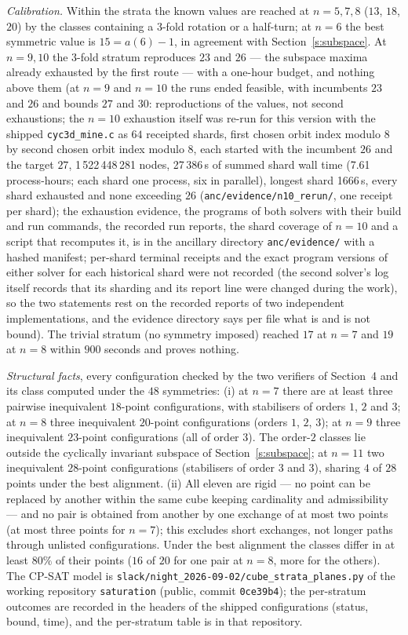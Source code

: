 \documentclass[11pt,a4paper]{article}
\begin{document}
\emph{Calibration.}  Within the strata the known values are reached at $n=5,7,8$ ($13$, $18$,
$20$) by the classes containing a $3$-fold rotation or a half-turn; at $n=6$ the best symmetric
value is $15=a(6)-1$, in agreement with Section~\ref{s:subspace}.  At $n=9,10$ the $3$-fold
stratum reproduces $23$ and $26$ --- the subspace maxima already exhausted by the first route ---
with a one-hour budget, and nothing above them (at $n=9$ and $n=10$ the runs ended feasible, with incumbents
$23$ and $26$ and bounds $27$ and $30$: reproductions of the values, not second exhaustions; the $n=10$
exhaustion itself was re-run for this version with the shipped \texttt{cyc3d\_mine.c} as $64$ receipted shards,
first chosen orbit index modulo $8$ by second chosen orbit index modulo $8$, each started with the incumbent $26$ and
the target $27$, 1\,522\,448\,281 nodes, 27\,386\,s of summed shard wall time (7.61 process-hours; each shard one process, six in parallel), longest shard 1666\,s, every shard exhausted and none exceeding $26$
(\texttt{anc/evidence/n10\_rerun/}, one receipt per shard); the exhaustion evidence, the
programs of both solvers with their build and run commands, the recorded run reports, the shard coverage
of $n=10$ and a script that recomputes it, is in the ancillary directory \texttt{anc/evidence/} with a
hashed manifest; per-shard terminal receipts and the exact program versions of either solver for each
historical shard were not recorded (the second solver's log itself records that its sharding and its
report line were changed during the work), so the two statements rest on the recorded reports of two
independent implementations, and the evidence directory says per file what is and is not bound).  The trivial stratum (no symmetry imposed)
reached $17$ at $n=7$ and $19$ at $n=8$ within $900$ seconds and proves nothing.

\emph{Structural facts}, every configuration checked by the two verifiers of Section~4 and its
class computed under the $48$ symmetries: (i) at $n=7$ there are at least three pairwise
inequivalent $18$-point configurations, with stabilisers of orders $1$, $2$ and $3$; at $n=8$
three inequivalent $20$-point configurations (orders $1$, $2$, $3$); at $n=9$ three inequivalent
$23$-point configurations (all of order $3$).  The order-$2$ classes lie outside the cyclically
invariant subspace of Section~\ref{s:subspace}; at $n=11$ two inequivalent $28$-point configurations
(stabilisers of order $3$ and $3$), sharing $4$ of $28$ points under the best alignment.  (ii) All eleven are rigid --- no point can be
replaced by another within the same cube keeping cardinality and admissibility --- and no pair is
obtained from another by one exchange of at most two points (at most three points for $n=7$); this
excludes short exchanges, not longer paths through unlisted configurations.  Under the best alignment the classes differ in at least $80\%$ of
their points ($16$ of $20$ for one pair at $n=8$, more for the others).  The CP-SAT model is \texttt{slack/night\_2026-09-02/cube\_strata\_planes.py} of the working repository \texttt{saturation} (public, commit \texttt{0ce39b4}); the per-stratum outcomes
are recorded in the headers of the shipped configurations (status, bound, time), and the per-stratum table is in that repository.
\end{document}
